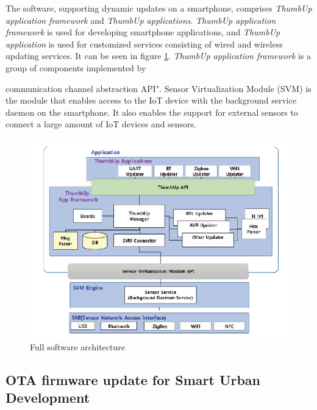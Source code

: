 \documentclass[12pt,a4paper]{article}
\begin{document}
The software, supporting dynamic updates on a smartphone, comprises \textit{ThumbUp application framework} and \textit{ThumbUp applications}. \textit{ThumbUp application framework} is used for developing smartphone applications, and \textit{ThumbUp application} is used for customized services consisting of wired and wireless updating services. It can be seen in figure \ref{full_architecture}. \textit{ThumbUp application framework} is a group of components implemented by {communication channel abstraction API". Sensor Virtualization Module (SVM) is the module that enables access to the IoT device with the background service daemon on the smartphone. It also enables the support for external sensors to connect a large amount of IoT devices and sensors. \cite{r29} \\

\begin{figure}[H]
\centering
\includegraphics[scale=1]{full_architecture.PNG}
\caption{Full software architecture \cite{r29}}
\label{full_architecture}
\end{figure}
\subsection{OTA firmware update for Smart Urban Development}

}
\end{document}
